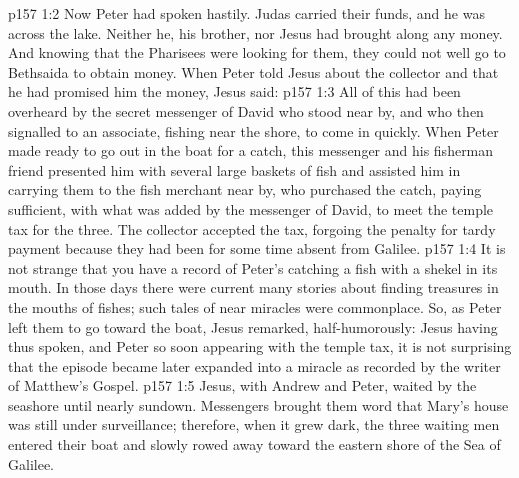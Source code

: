 \vs p157 1:2 Now Peter had spoken hastily. Judas carried their funds, and he was across the lake. Neither he, his brother, nor Jesus had brought along any money. And knowing that the Pharisees were looking for them, they could not well go to Bethsaida to obtain money. When Peter told Jesus about the collector and that he had promised him the money, Jesus said: 
\vs p157 1:3 All of this had been overheard by the secret messenger of David who stood near by, and who then signalled to an associate, fishing near the shore, to come in quickly. When Peter made ready to go out in the boat for a catch, this messenger and his fisherman friend presented him with several large baskets of fish and assisted him in carrying them to the fish merchant near by, who purchased the catch, paying sufficient, with what was added by the messenger of David, to meet the temple tax for the three. The collector accepted the tax, forgoing the penalty for tardy payment because they had been for some time absent from Galilee.
\vs p157 1:4 It is not strange that you have a record of Peter’s catching a fish with a shekel in its mouth. In those days there were current many stories about finding treasures in the mouths of fishes; such tales of near miracles were commonplace. So, as Peter left them to go toward the boat, Jesus remarked, half\hyp{}humorously:  Jesus having thus spoken, and Peter so soon appearing with the temple tax, it is not surprising that the episode became later expanded into a miracle as recorded by the writer of Matthew’s Gospel.
\vs p157 1:5 Jesus, with Andrew and Peter, waited by the seashore until nearly sundown. Messengers brought them word that Mary’s house was still under surveillance; therefore, when it grew dark, the three waiting men entered their boat and slowly rowed away toward the eastern shore of the Sea of Galilee.
